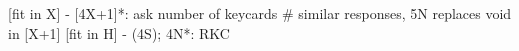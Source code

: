 [fit in X] - [4X+1]*: ask number of keycards
# similar responses, 5N replaces void in [X+1]
[fit in H] - (4S); 4N*: RKC
